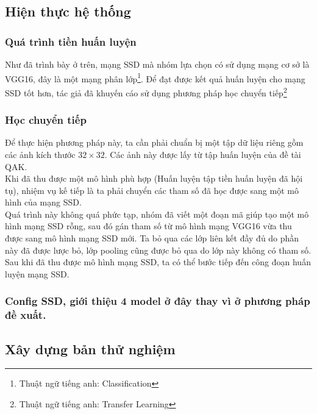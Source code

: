 \documentclass[a4paper,12pt]{article}
\begin{document}
	\subsection{Hiện thực hệ thống}
	
	\subsubsection{Quá trình tiền huấn luyện}
	Như đã trình bày ở trên, mạng SSD\cite{liu2016ssd} mà nhóm lựa chọn có sử dụng mạng cơ sở là VGG16\cite{simonyan2014very}, đây là một mạng phân lớp\footnote{Thuật ngữ tiếng anh: Classification}. Để đạt được kết quả huấn luyện cho mạng SSD\cite{liu2016ssd} tốt hơn, tác giả đã khuyến cáo sử dụng phương pháp học chuyển tiếp\footnote{Thuật ngữ tiếng anh: Transfer Learning}\cite{liu2016ssd}
	
	\subsubsection{Học chuyển tiếp}
	
	Để thực hiện phương pháp này, ta cần phải chuẩn bị một tập dữ liệu riêng gồm các ảnh kích thước $32 \times 32$. Các ảnh này được lấy từ tập huấn luyện của đề tài QAK.\\
	
	Khi đã thu được một mô hình phù hợp (Huấn luyện tập tiền huấn luyện đã hội tụ), nhiệm vụ kế tiếp là ta phải chuyển các tham số đã học được sang một mô hình của mạng SSD\cite{liu2016ssd}.\\
	
	Quá trình này không quá phức tạp, nhóm đã viết một đoạn mã giúp tạo một mô hình mạng SSD rỗng, sau đó gán tham số từ mô hình mạng VGG16\cite{simonyan2014very} vừa thu được sang mô hình mạng SSD mới. Ta bỏ qua các lớp liên kết đầy đủ do phần này đã được lược bỏ, lớp pooling cũng được bỏ qua do lớp này không có tham số. \\
	
	Sau khi đã thu được mô hình mạng SSD, ta có thể bước tiếp đến công đoạn huấn luyện mạng SSD.
	\subsubsection{Config SSD, giới thiệu 4 model ở đây thay vì ở phương pháp đề xuất.}
	
	\subsection{Xây dựng bản thử nghiệm}
	
\end{document}
